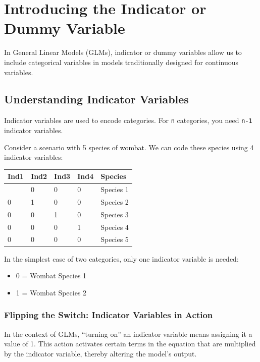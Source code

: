 \documentclass[
  letterpaper,
  DIV=11,
  numbers=noendperiod]{scrreprt}
\providecommand{\tightlist}{%
  \setlength{\itemsep}{0pt}\setlength{\parskip}{0pt}}\usepackage{longtable,booktabs,array}
\begin{document}
\section{Introducing the Indicator or Dummy
Variable}\label{introducing-the-indicator-or-dummy-variable}

In General Linear Models (GLMs), indicator or dummy variables allow us
to include categorical variables in models traditionally designed for
continuous variables.

\subsection{Understanding Indicator
Variables}\label{understanding-indicator-variables}

Indicator variables are used to encode categories. For \texttt{n}
categories, you need \texttt{n-1} indicator variables.

Consider a scenario with 5 species of wombat. We can code these species
using 4 indicator variables:

\begin{longtable}[]{@{}lllll@{}}
\toprule\noalign{}
Ind1 & Ind2 & Ind3 & Ind4 & Species \\
\midrule\noalign{}
\endhead
\bottomrule\noalign{}
\endlastfoot
1 & 0 & 0 & 0 & Species 1 \\
0 & 1 & 0 & 0 & Species 2 \\
0 & 0 & 1 & 0 & Species 3 \\
0 & 0 & 0 & 1 & Species 4 \\
0 & 0 & 0 & 0 & Species 5 \\
\end{longtable}

In the simplest case of two categories, only one indicator variable is
needed:

\begin{itemize}
\tightlist
\item
  0 = Wombat Species 1
\item
  1 = Wombat Species 2
\end{itemize}

\subsubsection{Flipping the Switch: Indicator Variables in
Action}\label{flipping-the-switch-indicator-variables-in-action}

In the context of GLMs, ``turning on'' an indicator variable means
assigning it a value of 1. This action activates certain terms in the
equation that are multiplied by the indicator variable, thereby altering
the model's output.
\end{document}
